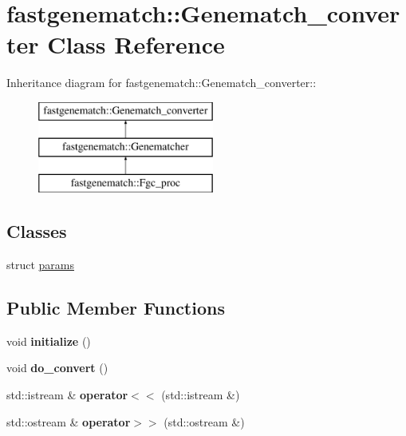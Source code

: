 \hypertarget{classfastgenematch_1_1Genematch__converter}{
\section{fastgenematch::Genematch\_\-converter Class Reference}
\label{classfastgenematch_1_1Genematch__converter}
}
Inheritance diagram for fastgenematch::Genematch\_\-converter::\begin{figure}[H]
\begin{center}
\leavevmode
\includegraphics[height=3cm]{classfastgenematch_1_1Genematch__converter}
\end{center}
\end{figure}
\subsection*{Classes}
\begin{DoxyCompactItemize}
\item 
struct \hyperlink{structfastgenematch_1_1Genematch__converter_1_1params}{params}
\end{DoxyCompactItemize}
\subsection*{Public Member Functions}
\begin{DoxyCompactItemize}
\item 
\hypertarget{classfastgenematch_1_1Genematch__converter_a938d1c275e3a693759615fadc1738dcd}{
void {\bfseries initialize} ()}
\label{classfastgenematch_1_1Genematch__converter_a938d1c275e3a693759615fadc1738dcd}

\item 
\hypertarget{classfastgenematch_1_1Genematch__converter_a9be3e65398d049c75025a36a55e12ca4}{
void {\bfseries do\_\-convert} ()}
\label{classfastgenematch_1_1Genematch__converter_a9be3e65398d049c75025a36a55e12ca4}

\item 
\hypertarget{classfastgenematch_1_1Genematch__converter_a9e95e1ac101beafbe65c01ee7d1e5134}{
std::istream \& {\bfseries operator$<$$<$} (std::istream \&)}
\label{classfastgenematch_1_1Genematch__converter_a9e95e1ac101beafbe65c01ee7d1e5134}

\item 
\hypertarget{classfastgenematch_1_1Genematch__converter_af38195c890cb992760b8164a2ad596d8}{
std::ostream \& {\bfseries operator$>$$>$} (std::ostream \&)}
\label{classfastgenematch_1_1Genematch__converter_af38195c890cb992760b8164a2ad596d8}

\end{DoxyCompactItemize}

